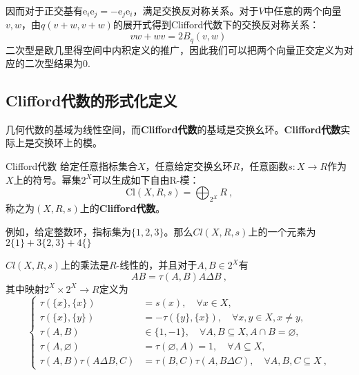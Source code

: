 因而对于正交基有$\mathrm{e}_i\mathrm{e}_j=-\mathrm{e}_j\mathrm{e}_i$，满足交换反对称关系。对于$V$中任意的两个向量$v,w$，由$q(v+w,v+w)$的展开式得到Clifford代数下的交换反对称关系：
\begin{equation}
vw+wv=2B_q(v,w)~
\end{equation}
二次型是欧几里得空间中内积定义的推广，因此我们可以把两个向量正交定义为对应的二次型结果为0.

\subsection{Clifford代数的形式化定义}
几何代数的基域为线性空间，而\textbf{Clifford代数}的基域是交换幺环。\textbf{Clifford代数}实际上是交换环上的模。
\begin{definition}{Clifford代数}
给定任意指标集合$X$，任意给定交换幺环$R$，任意函数$s:X\rightarrow {R}$作为$X$上的符号。幂集$2^X$可以生成如下自由R-模：
\begin{equation}
\mathrm{Cl}(X,R,s)=\bigoplus_{2^X}R~,
\end{equation}
称之为$(X,R,s)$上的\textbf{Clifford代数}。
\end{definition}

例如，给定整数环，指标集为$\{1,2,3\}$。那么$Cl(X,R,s)$上的一个元素为$2\{1\}+3\{2,3\}+4\{\}$


$Cl(X,R,s)$上的乘法是$R$-线性的，并且对于$A,B\in 2^X$有
\begin{equation}\label{eq_clf01_1}
AB=\tau(A,B)A\Delta B~,
\end{equation}
其中映射$2^X \times 2^X \rightarrow R$定义为
\begin{equation}
\left\{\begin{aligned}
\tau(\{x\},\{x\}) & =s(x), \quad \forall x \in X, \\
\tau(\{x\},\{y\}) & =-\tau(\{y\},\{x\}), \quad \forall x, y \in X, x \neq y, \\
\tau(A, B) & \in\{1,-1\}, \quad \forall A, B \subseteq X, A \cap B=\varnothing, \\
\tau(A, \varnothing) & =\tau(\varnothing, A)=1, \quad \forall A \subseteq X, \\
\tau(A, B) \tau(A \Delta B, C) & =\tau(B, C) \tau(A, B \Delta C), \quad \forall A, B, C \subseteq X~,
\end{aligned}\right.
\end{equation}


